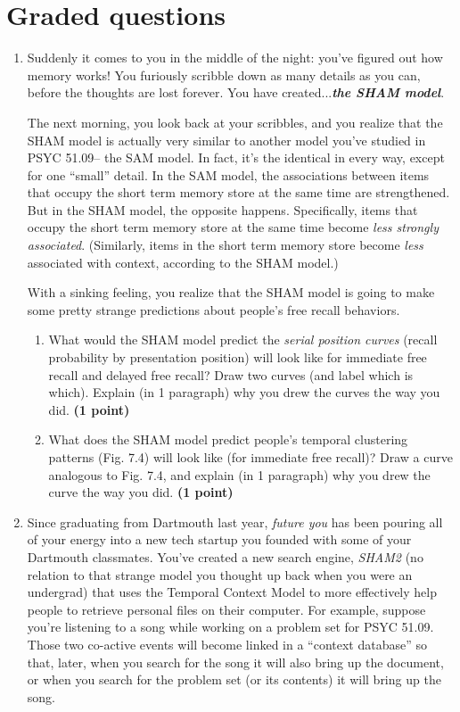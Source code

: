 \documentclass[11pt]{article}
\begin{document}
\section*{Graded questions}
\begin{enumerate}
\item Suddenly it comes to you in the middle of the night: you've figured
  out how memory works!  You furiously scribble down as many details
  as you can, before the thoughts are lost forever.  You have
  created...\textit{\textbf{the SHAM model}}.

The next morning, you look back at your scribbles, and you realize
that the SHAM model is actually very similar to another model you've studied in
PSYC 51.09-- the SAM model.  In fact, it's the identical in every way,
except for one ``small'' detail.  In the SAM model, the associations
between items that occupy the short term memory store at the same time
are strengthened.  But in the SHAM model, the opposite happens.  Specifically,
items that occupy the short term memory store at the same time become
\textit{less strongly associated}.  (Similarly, items in the short
term memory store become \textit{less} associated with context,
according to the SHAM model.)

With a sinking feeling, you realize that the SHAM model is going to
make some pretty strange predictions about people's free recall
behaviors.
\begin{enumerate}
\item What would the SHAM model predict the \textit{serial position
    curves} (recall probability by presentation position) will look like for immediate free recall and
  delayed free recall?  Draw two curves (and label which is which).
  Explain (in 1 paragraph) why you drew the curves the way you
  did.  \textbf{(1 point)}

\item What does the SHAM model predict people's temporal clustering
  patterns (Fig. 7.4) will look like (for immediate free recall)?
  Draw a curve analogous to Fig. 7.4, and explain (in 1 paragraph) why
  you drew the curve the way you did.  \textbf{(1 point)}
\end{enumerate}

\item Since graduating from Dartmouth last year, \textit{future you} has been
  pouring all of your energy into a new tech startup you founded with
  some of your Dartmouth classmates.  You've created a new search
  engine, \textit{SHAM2} (no relation to that strange model you
  thought up back when you were an undergrad) that uses the Temporal
  Context Model to more effectively help people to retrieve personal
  files on their computer.  For example, suppose you're listening to a song
  while working on a problem set for PSYC 51.09.  Those two co-active events will become
  linked in a ``context database'' so that, later, when you search for
  the song it will also bring up the document, or when you search for the
  problem set (or its contents) it will bring up the song.


\end{enumerate}
\end{document}
